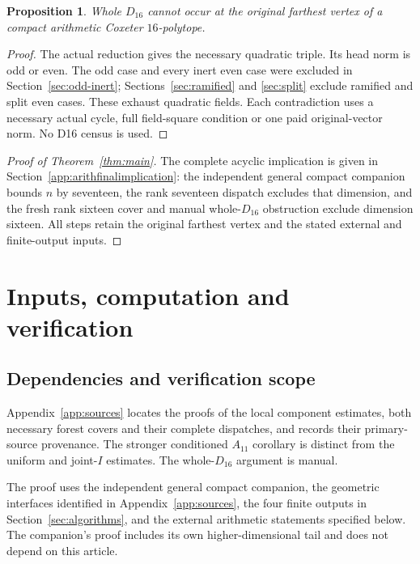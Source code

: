 \documentclass[11pt]{article}
\newtheorem{proposition}[theorem]{Proposition}
\begin{document}
\begin{proposition}\label{prop:noD16}
Whole $D_{16}$ cannot occur at the original farthest vertex
of a compact arithmetic Coxeter $16$-polytope.
\end{proposition}
\begin{proof}
The actual reduction gives the necessary quadratic triple.
Its head norm is odd or even. The odd case and every inert even
case were excluded in Section~\ref{sec:odd-inert};
Sections~\ref{sec:ramified} and \ref{sec:split} exclude
ramified and split even cases. These exhaust quadratic fields.
Each contradiction uses a necessary actual cycle, full field-square
condition or one paid original-vector norm. No D16 census is used.
\end{proof}

\begin{proof}[Proof of Theorem~\ref{thm:main}]
The complete acyclic implication is given in
Section~\ref{app:arithfinalimplication}: the independent general compact
companion bounds $n$ by seventeen, the rank seventeen dispatch excludes that
dimension, and the fresh rank sixteen cover and manual whole-$D_{16}$
obstruction exclude dimension sixteen.
All steps retain the original farthest vertex and the stated external
and finite-output inputs.
\end{proof}

\section{Inputs, computation and verification}\label{sec:verification}

\subsection{Dependencies and verification scope}
Appendix~\ref{app:sources} locates the proofs of the local component
estimates, both necessary forest covers and their complete dispatches,
and records their primary-source provenance. The stronger conditioned
$A_{11}$ corollary is distinct from the uniform and joint-$I$ estimates.
The whole-$D_{16}$ argument is manual.

The proof uses the independent general compact companion, the
geometric interfaces identified in Appendix~\ref{app:sources}, the four
finite outputs in Section~\ref{sec:algorithms}, and the external
arithmetic statements specified below. The companion's proof includes
its own higher-dimensional tail and does not depend on this article.
\end{document}
